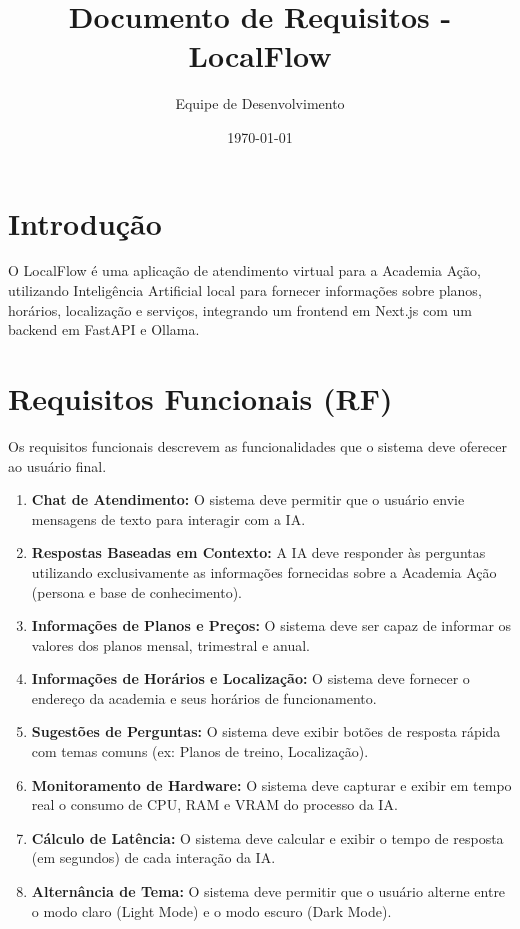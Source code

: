\documentclass{article}
\title{Documento de Requisitos - LocalFlow}
\author{Equipe de Desenvolvimento}
\date{\today}
\begin{document}
\maketitle

\section{Introdução}
O LocalFlow é uma aplicação de atendimento virtual para a Academia Ação, utilizando Inteligência Artificial local para fornecer informações sobre planos, horários, localização e serviços, integrando um frontend em Next.js com um backend em FastAPI e Ollama.

\section{Requisitos Funcionais (RF)}
Os requisitos funcionais descrevem as funcionalidades que o sistema deve oferecer ao usuário final.

\begin{enumerate}[label=RF\arabic*:, leftmargin=1.5cm]
    \item \textbf{Chat de Atendimento:} O sistema deve permitir que o usuário envie mensagens de texto para interagir com a IA.
    \item \textbf{Respostas Baseadas em Contexto:} A IA deve responder às perguntas utilizando exclusivamente as informações fornecidas sobre a Academia Ação (persona e base de conhecimento).
    \item \textbf{Informações de Planos e Preços:} O sistema deve ser capaz de informar os valores dos planos mensal, trimestral e anual.
    \item \textbf{Informações de Horários e Localização:} O sistema deve fornecer o endereço da academia e seus horários de funcionamento.
    \item \textbf{Sugestões de Perguntas:} O sistema deve exibir botões de resposta rápida com temas comuns (ex: Planos de treino, Localização).
    \item \textbf{Monitoramento de Hardware:} O sistema deve capturar e exibir em tempo real o consumo de CPU, RAM e VRAM do processo da IA.
    \item \textbf{Cálculo de Latência:} O sistema deve calcular e exibir o tempo de resposta (em segundos) de cada interação da IA.
    \item \textbf{Alternância de Tema:} O sistema deve permitir que o usuário alterne entre o modo claro (Light Mode) e o modo escuro (Dark Mode).
\end{enumerate}
\end{document}

